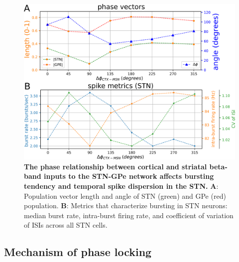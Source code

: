 \begin{figure}
\centering
\includegraphics[width=\textwidth]{ch_detailed_model/figs_split/fig_exogenous_sweep-ctx-msn-phase_C-metrics.png}
\caption{
\textbf{The phase relationship between cortical and striatal beta-band inputs to the STN-GPe network affects bursting tendency and temporal spike dispersion in the STN.}
\textbf{A}: Population vector length and angle of STN (green) and GPe (red) population.
\textbf{B}: Metrics that characterize bursting in STN neurons: median burst rate, intra-burst firing rate, and coefficient of variation of ISIs across all STN cells.
}
\label{fig:exogenous_sweep-ctx-msn-phase_C-metrics}
\end{figure}

%
%
\subsection{Mechanism of phase locking}

%
%
%
%

%
%
%

